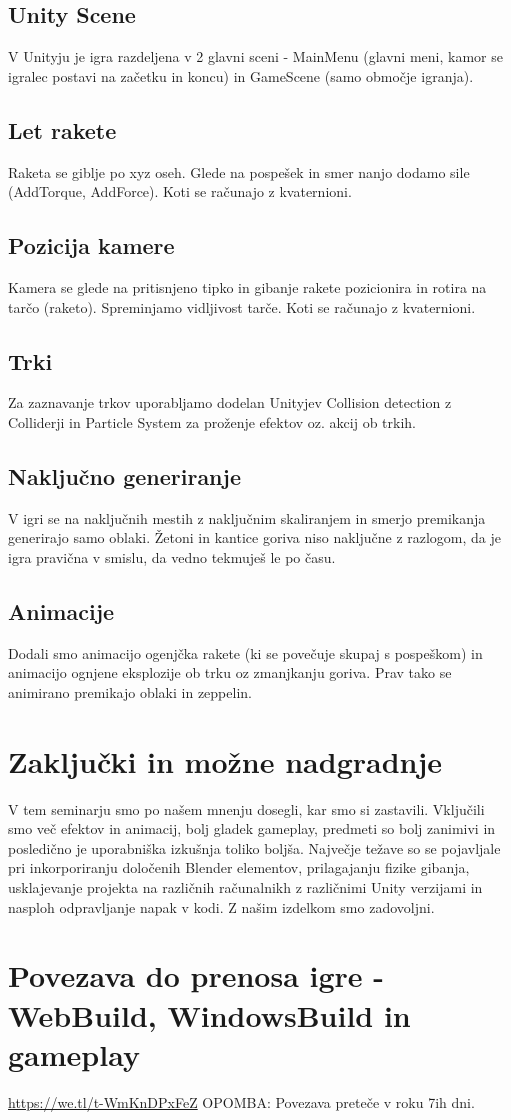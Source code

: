 \documentclass[a4paper]{article}
\begin{document}
\subsection{Unity Scene}
V Unityju je igra razdeljena v 2 glavni sceni - MainMenu (glavni meni, kamor se igralec postavi na začetku in koncu) in GameScene (samo območje igranja).

\subsection{Let rakete}
Raketa se giblje po xyz oseh. Glede na pospešek in smer nanjo dodamo sile (AddTorque, AddForce). Koti se računajo z kvaternioni.

\subsection{Pozicija kamere}
Kamera se glede na pritisnjeno tipko in gibanje rakete pozicionira in rotira na tarčo (raketo). Spreminjamo vidljivost tarče. Koti se računajo z kvaternioni.

\subsection{Trki}
Za zaznavanje trkov uporabljamo dodelan Unityjev Collision detection z Colliderji in Particle System za proženje efektov oz. akcij ob trkih.

\subsection{Naključno generiranje}
V igri se na naključnih mestih z naključnim skaliranjem in smerjo premikanja generirajo samo oblaki. Žetoni in kantice goriva niso naključne z razlogom, da je igra pravična v smislu, da vedno tekmuješ le po času.

\subsection{Animacije}
Dodali smo animacijo ogenjčka rakete (ki se povečuje skupaj s pospeškom) in animacijo ognjene eksplozije ob trku oz zmanjkanju goriva. Prav tako se animirano premikajo oblaki in zeppelin.

\section{Zaključki in možne nadgradnje}
V tem seminarju smo po našem mnenju dosegli, kar smo si zastavili. Vključili smo več efektov in animacij, bolj gladek gameplay, predmeti so bolj zanimivi in posledično je uporabniška izkušnja toliko boljša. Največje težave so se pojavljale pri inkorporiranju določenih Blender elementov, prilagajanju fizike gibanja, usklajevanje projekta na različnih računalnikh z različnimi Unity verzijami in nasploh odpravljanje napak v kodi. Z našim izdelkom smo zadovoljni.

\section{Povezava do prenosa igre -WebBuild, WindowsBuild in gameplay}
{\url{https://we.tl/t-WmKnDPxFeZ}}
OPOMBA: Povezava preteče v roku 7ih dni.


\small

\end{document}
